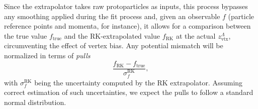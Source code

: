 Since the extrapolator takes raw protoparticles as inputs, this process bypasses any smoothing applied during the fit process and, given an observable $f$ (particle reference points and momenta, for instance), it allows for a comparison between the true value $f_\text{true}$ and the RK-extrapolated value $f_\text{RK}$ at the actual $z_\text{vtx}^\Lambda$, circumventing the effect of vertex bias.
Any potential mismatch will be normalized in terms of \textit{pulls}
\begin{equation}
	\frac{f_\text{RK} - f_\text{true}}{\sigma_f^\text{RK}},
\end{equation}
with $\sigma_f^\text{RK}$ being the uncertainty computed by the RK extrapolator.
Assuming correct estimation of such uncertainties, we expect the pulls to follow a standard normal distribution.


